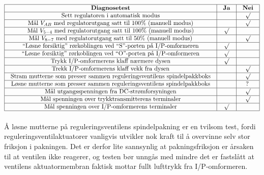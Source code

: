 






$$\vbox{\offinterlineskip
\halign{\strut
\vrule \quad\hfil # \ \hfil & 
\vrule \quad\hfil # \ \hfil & 
\vrule \quad\hfil # \ \hfil \vrule \cr
\noalign{\hrule}
%
{\bf Diagnosetest} & {\bf Ja} & {\bf Nei} \cr
%
\noalign{\hrule}
%
Sett regulatoren i automatisk modus &  & $\surd$ \cr
%
\noalign{\hrule}
%
Mål $V_{AB}$ med regulatorutgang satt til 100\% (manuell modus) &  & $\surd$ \cr
%
\noalign{\hrule}
%
Mål $V_{5-4}$ med regulatorutgang satt til 100\% (manuell modus) & $\surd$ &  \cr
%
\noalign{\hrule}
%
Mål $V_{8-7}$ med regulatorutgang satt til 50\% (manuell modus) &  & $\surd$ \cr
%
\noalign{\hrule}
%
``Løsne forsiktig'' rørkoblingen ved ``S''-porten på I/P-omformeren & $\surd$ &  \cr
%
\noalign{\hrule}
%
``Løsne forsiktig'' rørkoblingen ved ``O''-porten på I/P-omformeren & $\surd$ &  \cr
%
\noalign{\hrule}
%
Trykk I/P-omformerens klaff nærmere dysen & $\surd$ &  \cr
%
\noalign{\hrule}
%
Trekk I/P-omformerens klaff vekk fra dysen &  & $\surd$ \cr
%
\noalign{\hrule}
%
Stram mutterne som presser sammen reguleringsventilens spindelpakkboks &  & $\surd$ \cr
%
\noalign{\hrule}
%
Løsne mutterne som presser sammen reguleringsventilens spindelpakkboks &  & ? \cr
%
\noalign{\hrule}
%
Mål utgangsspenningen fra DC-strømforsyningen &  & $\surd$ \cr
%
\noalign{\hrule}
%
Mål spenningen over trykktransmitterens terminaler &  & $\surd$ \cr
%
\noalign{\hrule}
%
Mål spenningen over I/P-omformerens terminaler & $\surd$ &  \cr
%
\noalign{\hrule}
} %
}$$ %

Å løsne mutterne på reguleringsventilens spindelpakning er en tvilsom test, fordi reguleringsventilaktuatorer vanligvis utvikler nok kraft til å overvinne selv stor friksjon i pakningen. Det er derfor lite sannsynlig at pakningsfriksjon er årsaken til at ventilen ikke reagerer, og testen bør unngås med mindre det er fastslått at ventilens aktuatormembran faktisk mottar fullt lufttrykk fra I/P-omformeren.
 








